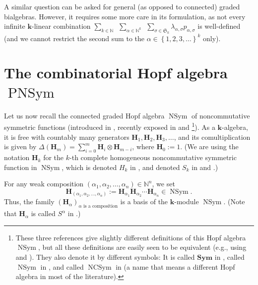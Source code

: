 \documentclass[numbers=enddot,12pt,final,onecolumn,notitlepage]{scrartcl}%
\theoremstyle{definition}
\let\sumnonlimits\sum
\renewcommand{\sum}{\sumnonlimits\limits}
\begin{document}
A similar question can be asked for general (as opposed to connected) graded
bialgebras. However, it requires some more care in its formulation, as not
every infinite $\mathbf{k}$-linear combination $\sum_{k\in\mathbb{N}}%
\ \ \sum_{\alpha\in\mathbb{N}^{k}}\ \ \sum_{\sigma\in\mathfrak{S}_{k}}%
\lambda_{\alpha,\sigma}p_{\alpha,\sigma}$ is well-defined (and we cannot
restrict the second sum to the $\alpha\in\left\{  1,2,3,\ldots\right\}  ^{k}$ only).

\section{\label{sec.PNSym}The combinatorial Hopf algebra
$\operatorname*{PNSym}$}

Let us now recall the connected graded Hopf algebra $\operatorname*{NSym}$ of
noncommutative symmetric functions (introduced in \cite{ncsf1}, recently
exposed in \cite[\S 5.4]{GriRei} and \cite[Definition 6.1]{Meliot}%
\footnote{These three references give slightly different definitions of this
Hopf algebra $\operatorname*{NSym}$, but all these definitions are easily seen
to be equivalent (e.g., using \cite[Note 3.5, Proposition 3.8, Proposition
3.9]{ncsf1} and \cite[Proposition 6.2, Proposition 6.3]{Meliot}). They also
denote it by different symbols: It is called $\mathbf{Sym}$ in \cite{ncsf1},
called $\operatorname*{NSym}$ in \cite[\S 5.4]{GriRei}, and called
$\operatorname*{NCSym}$ in \cite[Definition 6.1]{Meliot} (a name that means a
different Hopf algebra in most of the literature).}). As a $\mathbf{k}%
$-algebra, it is free with countably many generators $\mathbf{H}%
_{1},\mathbf{H}_{2},\mathbf{H}_{3},\ldots$, and its comultiplication is given
by $\Delta\left(  \mathbf{H}_{m}\right)  =\sum_{i=0}^{m}\mathbf{H}_{i}%
\otimes\mathbf{H}_{m-i}$, where $\mathbf{H}_{0}:=1$. (We are using the
notation $\mathbf{H}_{k}$ for the $k$-th complete homogeneous noncommutative
symmetric function in $\operatorname*{NSym}$, which is denoted $H_{k}$ in
\cite[Theorem 5.4.2]{GriRei}, and denoted $S_{k}$ in \cite[(22)]{ncsf1} and
\cite{Meliot}.)

For any weak composition $\left(  \alpha_{1},\alpha_{2},\ldots,\alpha
_{n}\right)  \in\mathbb{N}^{n}$, we set%
\[
\mathbf{H}_{\left(  \alpha_{1},\alpha_{2},\ldots,\alpha_{n}\right)
}:=\mathbf{H}_{\alpha_{1}}\mathbf{H}_{\alpha_{2}}\cdots\mathbf{H}_{\alpha_{n}%
}\in\operatorname*{NSym}.
\]
Thus, the family $\left(  \mathbf{H}_{\alpha}\right)  _{\alpha\text{ is a
composition}}$ is a basis of the $\mathbf{k}$-module $\operatorname*{NSym}$.
(Note that $\mathbf{H}_{\alpha}$ is called $S^{\alpha}$ in \cite{ncsf1}.)
\end{document}

